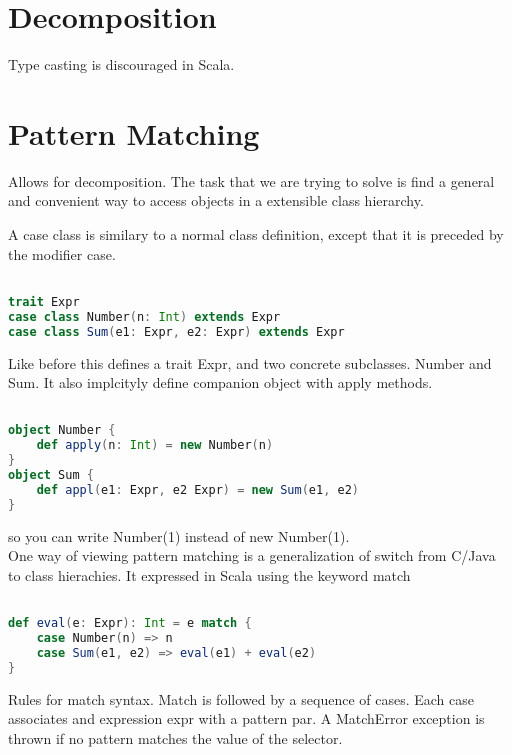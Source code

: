 \documentclass[10pt, a4paper]{report}
\begin{document}
\section{Decomposition}

Type casting is discouraged in Scala.

\section{Pattern Matching}

Allows for decomposition. The task that we are trying to solve is find a general and convenient way to access objects in a extensible class hierarchy.

A case class is similary to a normal class definition, except that it is preceded by the modifier case.

\begin{lstlisting}[language=scala]

trait Expr
case class Number(n: Int) extends Expr
case class Sum(e1: Expr, e2: Expr) extends Expr

\end{lstlisting}

Like before this defines a trait Expr, and two concrete subclasses. Number and Sum. It also implcityly define companion object with apply methods.

\begin{lstlisting}[language=scala]

object Number {
	def apply(n: Int) = new Number(n)
}
object Sum {
	def appl(e1: Expr, e2 Expr) = new Sum(e1, e2)
}


\end{lstlisting}

so you can write Number(1) instead of new Number(1).\\

One way of viewing pattern matching is a generalization of switch from C/Java to class hierachies. It expressed in Scala using the keyword match

\begin{lstlisting}[language=scala]

def eval(e: Expr): Int = e match {
	case Number(n) => n
	case Sum(e1, e2) => eval(e1) + eval(e2)
}

\end{lstlisting}

Rules for match syntax. Match is followed by a sequence of cases. Each case associates and expression expr with a pattern par. A MatchError exception is thrown if no pattern matches the value of the selector.\\
\end{document}
